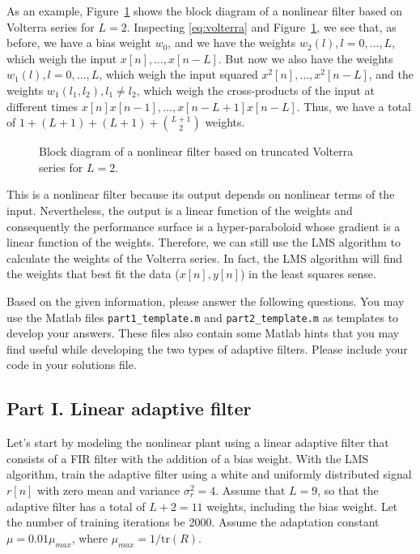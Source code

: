 \documentclass[10pt]{article}
\begin{document}
As an example, Figure~\ref{fig:volterra-diagram} shows the block diagram of a nonlinear filter based on Volterra series for $L = 2$. Inspecting \eqref{eq:volterra} and Figure~\ref{fig:volterra-diagram}, we see that, as before, we have a bias weight $w_0$, and we have the weights $w_2(l), l = 0, \ldots, L$, which weigh the input $x[n], \ldots, x[n-L]$. But now we also have the weights $w_1(l), l = 0, \ldots, L$, which weigh the input squared $x^2[n],\ldots,x^2[n-L]$, and the weights $w_1(l_1, l_2), l_1\neq l_2$, which weigh the cross-products of the input at different times $x[n]x[n-1],\ldots,x[n-L+1]x[n-L]$. Thus, we have a total of $1 + (L+1) + (L+1) + \binom{L+1}{2}$ weights.

\FloatBarrier
\begin{figure}[h!]
	\centering
	\resizebox{0.9\linewidth}{!}{}
	\caption{Block diagram of a nonlinear filter based on truncated Volterra series for $L = 2$.} \label{fig:volterra-diagram}
\end{figure}
\FloatBarrier

This is a nonlinear filter because its output depends on nonlinear terms of the input. Nevertheless, the output is a linear function of the weights and consequently the performance surface is a hyper-paraboloid whose gradient is a linear function of the weights. Therefore, we can still use the LMS algorithm to calculate the weights of the Volterra series. In fact, the LMS algorithm will find the weights that best fit the data ($x[n], y[n]$) in the least squares sense. 

Based on the given information, please answer the following questions. You may use the Matlab files \texttt{part1\_template.m} and \texttt{part2\_template.m} as templates to develop your answers. These files also contain some Matlab hints that you may find useful while developing the two types of adaptive filters. Please include your code in your solutions file.

\subsection*{Part I. Linear adaptive filter}
Let's start by modeling the nonlinear plant using a linear adaptive filter that consists of a FIR filter with the addition of a bias weight. With the LMS algorithm, train the adaptive filter using a white and uniformly distributed signal $r[n]$ with zero mean and variance $\sigma_r^2 = 4$. Assume that $L = 9$, so that the adaptive filter has a total of $L+2 = 11$ weights, including the bias weight. Let the number of training iterations be 2000. Assume the adaptation constant $\mu = 0.01\mu_{max}$, where $\mu_{max} = 1/\mathrm{tr}(R)$. 
\end{document}
